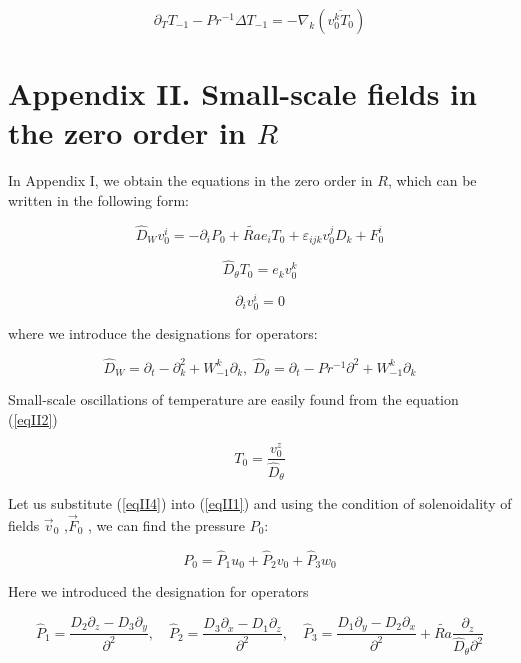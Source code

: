 \documentclass [12pt]{article}
\begin{document}
 \begin{equation}\label{eqI26}\partial
_{T} T_{-1} -Pr^{-1} \Delta T_{-1} =-\nabla _{k} \left(\overline{v_{0}^{k} T_{0}
}\right) \end{equation}


\section*{Appendix II. Small-scale fields in the zero order in $R$}

In Appendix I, we obtain the equations in the zero order in $R$, which can be written in the following form:

\begin{equation} \label{eqII1}
 \widehat{D}_{W} v_{0}^{i} =-\partial _{i} P_{0}+\widetilde{Ra}e_{i} T_{0}
+\varepsilon _{ijk} v_{0}^{j} D_{k} +F_{0}^{i}
\end{equation}

\begin{equation}
\label{eqII2} \widehat{D}_{\theta } T_{0} =e_{k} v_{0}^{k}  \end{equation}

\begin{equation} \label{eqII3}
 \partial _{i} v_{0}^{i} =0
\end{equation}

where we introduce the designations for operators:

\[\widehat{D}_{W} =\partial _{t} -\partial _{k}^{2} +W_{-1}^{k} \partial _{k} ,\;\widehat{D}_{\theta } =\partial _{t} -Pr^{-1}
\partial ^{2} +W_{-1}^{k} \partial _{k}\]

Small-scale oscillations of temperature are easily found from the equation (\ref{eqII2})

\begin{equation} \label{eqII4} T_{0} =\frac{v_{0}^{z} }{\widehat{D}_{\theta} }  \end{equation}

Let us substitute (\ref{eqII4}) into (\ref{eqII1}) and using the condition of solenoidality of fields $\vec{v}_{0} $ ,$\vec{F}_{0} $ , we can find the pressure $P_{0} $:

\begin{equation} \label{eqII5}
 P_{0} =\widehat{P}_{1} u_{0} +\widehat{P}_{2}v_{0} +\widehat{P}_{3} w_{0}
\end{equation}

Here we introduced the designation for operators

\[\widehat{P}_{1} =\frac{D_{2} \partial _{z}
-D_{3} \partial _{y} }{\partial ^{2} },\quad \widehat{P}_{2} =\frac{D_{3} \partial _{x} -D_{1}
\partial _{z} }{\partial ^{2}}  ,\quad \widehat{P}_{3} =\frac{D_{1} \partial _{y} -D_{2} \partial
_{x} }{\partial ^{2}}+\widetilde{Ra} \frac{{\partial _z }}{{\hat D_\theta \partial^2 }} \]
\end{document}
